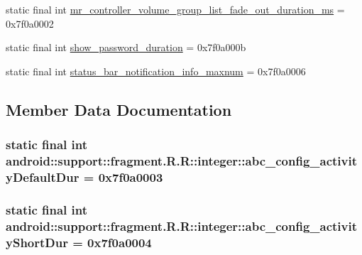 \begin{CompactItemize}
\item 
static final int \hyperlink{classandroid_1_1support_1_1fragment_1_1_r_1_1integer_7798fa977b69ab193d1633471aeadef5}{mr\_\-controller\_\-volume\_\-group\_\-list\_\-fade\_\-out\_\-duration\_\-ms} = 0x7f0a0002
\item 
static final int \hyperlink{classandroid_1_1support_1_1fragment_1_1_r_1_1integer_0246d861a1bf118de2a48eae1e6e7494}{show\_\-password\_\-duration} = 0x7f0a000b
\item 
static final int \hyperlink{classandroid_1_1support_1_1fragment_1_1_r_1_1integer_491829a99f0ebd388fc6f9ba4ac91b04}{status\_\-bar\_\-notification\_\-info\_\-maxnum} = 0x7f0a0006
\end{CompactItemize}


\subsection{Member Data Documentation}
\hypertarget{classandroid_1_1support_1_1fragment_1_1_r_1_1integer_8861772ed05f22eaa6bdb2cbcbb3f5df}{
\subsubsection[{abc\_\-config\_\-activityDefaultDur}]{\setlength{\rightskip}{0pt plus 5cm}static final int android::support::fragment.R.R::integer::abc\_\-config\_\-activityDefaultDur = 0x7f0a0003}}
\label{classandroid_1_1support_1_1fragment_1_1_r_1_1integer_8861772ed05f22eaa6bdb2cbcbb3f5df}


\hypertarget{classandroid_1_1support_1_1fragment_1_1_r_1_1integer_9d431171a1e26475291584c42adb36f5}{
\subsubsection[{abc\_\-config\_\-activityShortDur}]{\setlength{\rightskip}{0pt plus 5cm}static final int android::support::fragment.R.R::integer::abc\_\-config\_\-activityShortDur = 0x7f0a0004}}
\label{classandroid_1_1support_1_1fragment_1_1_r_1_1integer_9d431171a1e26475291584c42adb36f5}


